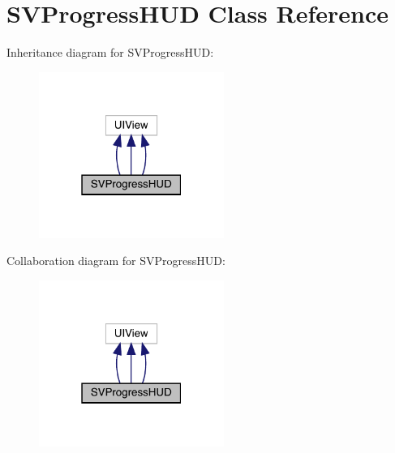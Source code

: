 \hypertarget{interface_s_v_progress_h_u_d}{}\section{S\+V\+Progress\+H\+UD Class Reference}
\label{interface_s_v_progress_h_u_d}


Inheritance diagram for S\+V\+Progress\+H\+UD\+:\nopagebreak
\begin{figure}[H]
\begin{center}
\leavevmode
\includegraphics[width=171pt]{interface_s_v_progress_h_u_d__inherit__graph}
\end{center}
\end{figure}


Collaboration diagram for S\+V\+Progress\+H\+UD\+:\nopagebreak
\begin{figure}[H]
\begin{center}
\leavevmode
\includegraphics[width=171pt]{interface_s_v_progress_h_u_d__coll__graph}
\end{center}
\end{figure}
